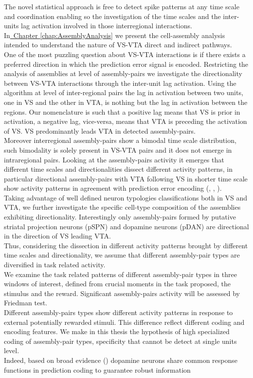 {The novel statistical approach is free to detect spike patterns at any time scale and coordination enabling so the investigation of the time scales and the inter-units lag activation involved in those interregional interactions.\\In\hyperref[chap:AssemblyAnalysis]{~Chapter \ref*{chap:AssemblyAnalysis}} we present the cell-assembly analysis intended to understand the nature of VS-VTA direct and indirect pathways.\\One of the most puzzling question about VS-VTA interactions is if there exists a preferred direction in which the prediction error signal is encoded. Restricting the analysis of assemblies at level of assembly-pairs we investigate the directionality between VS-VTA interactions through the inter-unit lag activation. Using the algorithm at level of inter-regional pairs the lag in activation between two units, one in VS and the other in VTA, is nothing but the lag in activation between the regions. Our nomenclature is such that a positive lag means that VS is prior in activation, a negative lag, vice-versa, means that VTA is preceding the activation of VS. VS predominantly leads VTA in detected assembly-pairs.\\Moreover interregional assembly-pairs show a bimodal time scale distribution, such bimodality is solely present in VS-VTA pairs and it does not emerge in intraregional pairs. Looking at the assembly-pairs activity it emerges that different time scales and directionalities dissect different activity patterns, in particular directional assembly-pairs with VTA following VS in shorter time scale show activity patterns in agreement with prediction error encoding (\cite{Tobler2003}, \cite{Nomoto2010}, \cite{Schultz2016}).\\Taking advantage of well defined neuron typologies classifications both in VS and VTA, we further investigate the specific cell-type composition of the assemblies exhibiting directionality. Interestingly only assembly-pairs formed by putative striatal projection neurons (pSPN) and dopamine neurons (pDAN) are directional in the direction of VS leading VTA.\\Thus, considering the dissection in different activity patterns brought by different time scales and directionality, we assume that different assembly-pair types are diversified in task related activity.\\We examine the task related patterns of different assembly-pair types in three windows of interest, defined from crucial moments in the task proposed, the stimulus and the reward. Significant assembly-pairs activity will be assessed by Friedman test.\\Different assembly-pairs types show different activity patterns in response to external potentially rewarded stimuli. This difference reflect different coding and encoding features. We make in this thesis the hypothesis of high specialized coding of assembly-pair types, specificity that cannot be detect at single units level.\\Indeed, based on broad evidence (\cite{Eshel}) dopamine neurons share common response functions in prediction coding to guarantee robust information }
